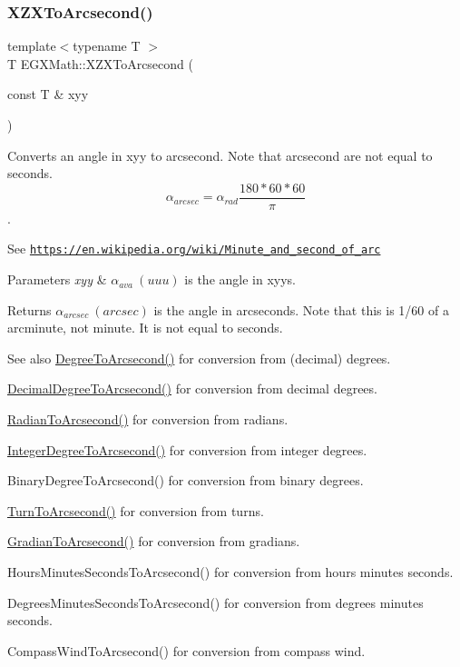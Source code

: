 \subsubsection{\texorpdfstring{X\+Z\+X\+To\+Arcsecond()}{XZXToArcsecond()}}
{\footnotesize\ttfamily template$<$typename T $>$ \\
T E\+G\+X\+Math\+::\+X\+Z\+X\+To\+Arcsecond (\begin{DoxyParamCaption}\item[{const T \&}]{xyy }\end{DoxyParamCaption})}



Converts an angle in xyy to arcsecond. Note that arcsecond are not equal to seconds. \[\alpha_{arcsec}=\alpha_{rad}\frac{180 * 60 * 60}{\pi}\]. 

See \href{https://en.wikipedia.org/wiki/Minute_and_second_of_arc}{\tt https\+://en.\+wikipedia.\+org/wiki/\+Minute\+\_\+and\+\_\+second\+\_\+of\+\_\+arc} 
\begin{DoxyParams}{Parameters}
{\em xyy} & $\alpha_{ava}\ (uuu)$ is the angle in xyys. \\
\hline
\end{DoxyParams}
\begin{DoxyReturn}{Returns}
$\alpha_{arcsec}\ (arcsec)$ is the angle in arcseconds. Note that this is 1/60 of a arcminute, not minute. It is not equal to seconds. 
\end{DoxyReturn}
\begin{DoxySeeAlso}{See also}
\mbox{\hyperlink{group___e_g_x_math-_angle_conversions-_degree_gaf85e2d765c248f447854a807a68a5de8}{Degree\+To\+Arcsecond()}} for conversion from (decimal) degrees. 

\mbox{\hyperlink{group___e_g_x_math-_angle_conversions-_decimal_degree_gab9d5635a6e35127b5245978aba508962}{Decimal\+Degree\+To\+Arcsecond()}} for conversion from decimal degrees. 

\mbox{\hyperlink{group___e_g_x_math-_angle_conversions-_radian_ga2f952f6675a0fc54bf72bfe4e3d2664a}{Radian\+To\+Arcsecond()}} for conversion from radians. 

\mbox{\hyperlink{group___e_g_x_math-_angle_conversions-_integer_degree_gaa04058a2fea3dc3678264a05fac6e1ae}{Integer\+Degree\+To\+Arcsecond()}} for conversion from integer degrees. 

Binary\+Degree\+To\+Arcsecond() for conversion from binary degrees. 

\mbox{\hyperlink{group___e_g_x_math-_angle_conversions-_turn_gaad072969abc59ef6f5b63ac6a176a11b}{Turn\+To\+Arcsecond()}} for conversion from turns. 

\mbox{\hyperlink{group___e_g_x_math-_angle_conversions-_gradian_gac768fd444195264165d332f2f5e84d92}{Gradian\+To\+Arcsecond()}} for conversion from gradians. 

Hours\+Minutes\+Seconds\+To\+Arcsecond() for conversion from hours minutes seconds. 

Degrees\+Minutes\+Seconds\+To\+Arcsecond() for conversion from degrees minutes seconds. 

Compass\+Wind\+To\+Arcsecond() for conversion from compass wind. 
\end{DoxySeeAlso}
